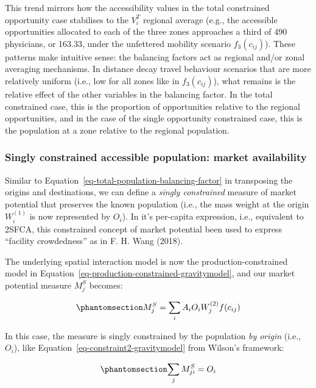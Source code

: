\documentclass[
]{article}
\begin{document}
This trend mirrors how the accessibility values in the total constrained
opportunity case stabilises to the \(V_i^T\) regional average (e.g., the
accessible opportunities allocated to each of the three zones approaches
a third of 490 physicians, or 163.33, under the unfettered mobility
scenario \(f_3(c_{ij})\)). These patterns make intuitive sense: the
balancing factors act as regional and/or zonal averaging mechanisms. In
distance decay travel behaviour scenarios that are more relatively
uniform (i.e., low for all zones like in \(f_3(c_{ij})\)), what remains
is the relative effect of the other variables in the balancing factor.
In the total constrained case, this is the proportion of opportunities
relative to the regional opportunities, and in the case of the single
opportunity constrained case, this is the population at a zone relative
to the regional population.

\subsubsection{Singly constrained accessible population: market
availability}\label{singly-constrained-accessible-population-market-availability}

Similar to Equation~\ref{eq-total-population-balancing-factor} in
transposing the origins and destinations, we can define a \emph{singly
constrained} measure of market potential that preserves the known
population (i.e., the mass weight at the origin \(W_i^{(1)}\) is now
represented by \(O_i\)). In it's per-capita expression, i.e., equivalent
to 2SFCA, this constrained concept of market potential been used to
express ``facility crowdedness'' as in F. H. Wang (2018).

The underlying spatial interaction model is now the
production-constrained model in
Equation~\ref{eq-production-constrained-gravitymodel}, and our market
potential measure \(M^S_j\) becomes:

\begin{equation}\phantomsection\label{eq-population-constrained-accessibility}{
M^S_j = \sum_i A_i O_i W_j^{(2)} f(c_{ij})
}\end{equation}

In this case, the measure is singly constrained by the population
\emph{by origin} (i.e., \(O_i\)), like
Equation~\ref{eq-constraint2-gravitymodel} from Wilson's framework:

\begin{equation}\phantomsection\label{eq-population-constraint}{
\sum_j M^S_{ji} =  O_i \\
}\end{equation}
\end{document}
